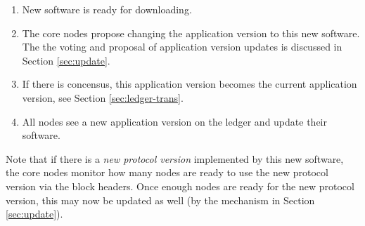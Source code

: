 \begin{enumerate}
  \item New software is ready for downloading.
  \item The core nodes propose changing
  the application version to this
  new software. The the voting and proposal of application version updates is discussed
    in Section \ref{sec:update}.
  \item If there is concensus, this application version becomes the current application version,
  see Section \ref{sec:ledger-trans}.
  \item All nodes see a new application version on the ledger and update their
  software.
\end{enumerate}

Note that if there is a \textit{new protocol version} implemented by this new
software, the core nodes monitor how many nodes are ready to use the new
protocol version via the block headers.
Once enough nodes are ready for the new protocol version, this
may now be updated as well (by the mechanism in Section \ref{sec:update}).
